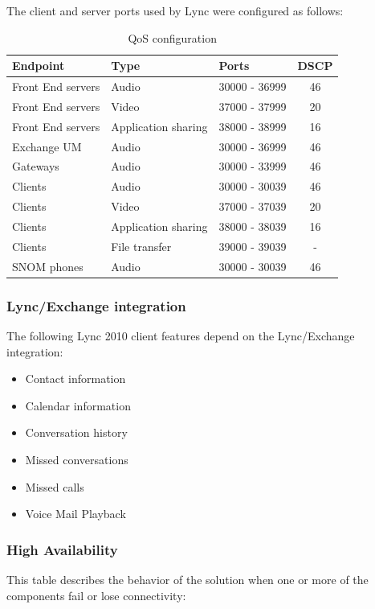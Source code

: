 		The client and server ports used by Lync were configured as follows:

		\begin{table}[H]
		\centering
		\begin{tabular}{lllc}
			Endpoint & Type & Ports & DSCP  \\ \hline 
			Front End servers & Audio & 30000 - 36999 & 46 \\
			Front End servers & Video & 37000 - 37999 & 20 \\
			Front End servers & Application sharing & 38000 - 38999 & 16 \\
			Exchange UM & Audio & 30000 - 36999 & 46 \\
			Gateways & Audio & 30000 - 33999 & 46 \\
			Clients & Audio & 30000 - 30039 & 46 \\
			Clients & Video & 37000 - 37039 & 20 \\
			Clients & Application sharing & 38000 - 38039 & 16 \\
			Clients & File transfer & 39000 - 39039 & - \\
			SNOM phones & Audio & 30000 - 30039 & 46 \\
		\end{tabular}
		\caption{\label{tab:case_qos} QoS configuration}
		\end{table}
	
	
	\subsubsection{Lync/Exchange integration}
	The following Lync 2010 client features depend on the Lync/Exchange integration:
	\begin{itemize}
		\item Contact information
		\item Calendar information
		\item Conversation history
		\item Missed conversations
		\item Missed calls
		\item Voice Mail Playback
	\end{itemize}


\subsubsection{High Availability}
This table describes the behavior of the solution when one or more of the components fail or lose connectivity:

